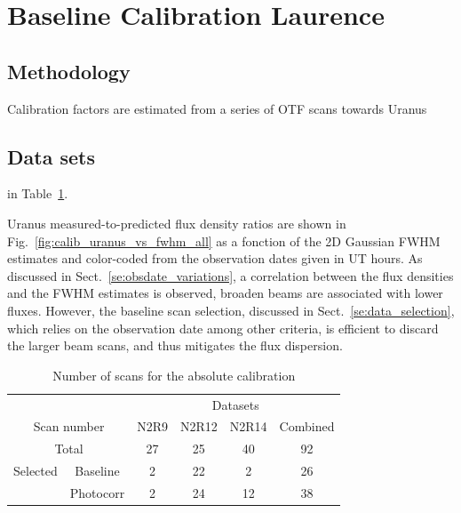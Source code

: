 \section{Baseline Calibration {\color{blue} Laurence} }

\subsection{Methodology}
Calibration factors are estimated from a series of OTF scans towards Uranus

\subsection{Data sets}

 in Table~\ref{tab:absolute_calibration_scan_numbers}.

Uranus measured-to-predicted flux density ratios are shown in Fig.~\ref{fig:calib_uranus_vs_fwhm_all} as a fonction of the 2D Gaussian FWHM estimates and color-coded from the observation dates given in UT hours. As discussed in Sect.~\ref{se:obsdate_variations}, a correlation between the flux densities and the FWHM estimates is observed, broaden beams are associated with lower fluxes. However, the baseline scan selection, discussed in Sect.~\ref{se:data_selection}, which relies on the observation date among other criteria, is efficient to discard the larger beam scans, and thus mitigates the flux dispersion.          

\begin{table}[th]
\begin{center}
\begin{tabular}{|c|c|c|c|c|c|}
  \hline
  \multicolumn{2}{|c|}{}            &  \multicolumn{4}{|c|}{Datasets} \\\cline{3-6}
  \multicolumn{2}{|c|}{Scan number} &  N2R9  & N2R12  &  N2R14  &  Combined \\
  \hline\hline
  \multicolumn{2}{|c|}{Total}       &   27   &   25    &   40    &    92  \\
  \hline
  Selected & Baseline               &   2    &   22    &    2    &    26  \\
           & Photocorr              &   2    &   24    &   12    &    38  \\
\hline\hline
\end{tabular}
\caption[Absolute calibration scan numbers]{Number of scans for the absolute calibration}
\label{tab:absolute_calibration_scan_numbers}
\end{center}
\end{table}



